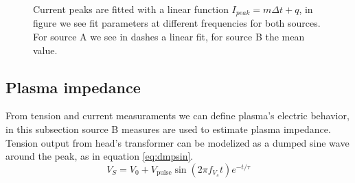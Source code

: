 \begin{figure}
 \centering
 \caption{Current peaks are fitted with a linear function $I_{peak} = m \Delta t + q$, in figure we see fit parameters at different frequencies for both sources. For source A we see in dashes a linear fit, for source B the mean value.}
 \label{fig:lingas_I}
\end{figure}


\subsection{Plasma impedance}
From tension and current measuraments we can define plasma's electric behavior, in this subsection source B measures are used to estimate plasma impedance. Tension output from head's transformer can be modelized as a dumped sine wave around the peak, as in equation \ref{eq:dmpsin}.
\begin{equation}
 V_{S} = V_{0} + V_{\text{pulse}} \sin{(2 \pi f_{V_{s}} t)} e^{-t/\tau}
 \label{eq:dmpsin}
\end{equation}

